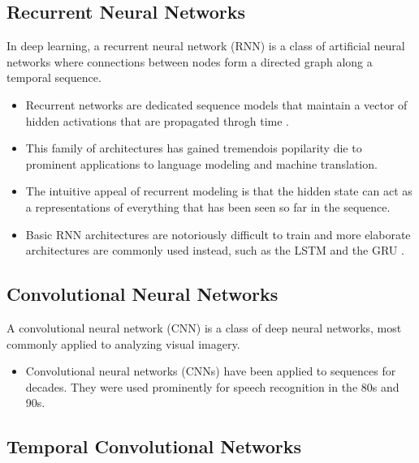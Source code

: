 \documentclass{scrartcl}
\begin{document}
\subsection{Recurrent Neural Networks}

In deep learning, a recurrent neural network (RNN) is a class of artificial neural networks where connections between nodes form a directed graph along a temporal sequence.

\begin{itemize}
\item Recurrent networks are dedicated sequence models that maintain a vector of hidden activations that are propagated throgh time \cite{Elman1990,Werbos1990,Graves2012}.
\item This family of architectures has gained tremendois popilarity die to prominent applications to language modeling and machine translation.
\item The intuitive appeal of recurrent modeling is that the hidden state can act as a representations of everything that has been seen so far in the sequence.
\item Basic RNN architectures are notoriously difficult to train and more elaborate architectures are commonly used instead, such as the LSTM \cite{Hochreiter1997} and the GRU \cite{Cho2014}.
\end{itemize}



\subsection{Convolutional Neural Networks}

A convolutional neural network (CNN) is a class of deep neural networks, most commonly applied to analyzing visual imagery.

\begin{itemize}
\item Convolutional neural networks (CNNs) \cite{LeCun1989} have been applied to sequences for decades. They were used prominently for speech recognition in the 80s and 90s.
\end{itemize}



\subsection{Temporal Convolutional Networks}
\end{document}
